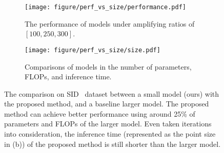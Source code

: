 \documentclass[10pt,twocolumn,letterpaper]{article}
\begin{document}
\begin{figure}[htbp]
    \centering
    \begin{subfigure}{0.48\linewidth}
    \texttt{[image: figure/perf\_vs\_size/performance.pdf]}
    \vspace{-0.35cm}
    \caption{The performance of models under amplifying ratios of $[100, 250, 300]$.}
    \end{subfigure}
    \hspace{0.1cm}
    \begin{subfigure}{0.48\linewidth}
    \texttt{[image: figure/perf\_vs\_size/size.pdf]}
    \vspace{-0.55cm}
    \caption{Comparisons of models in the number of parameters, FLOPs, and inference time.}
    \end{subfigure}
    \vspace{-0.7cm}
    \caption{The comparison on SID~\cite{chen2018learning} dataset between a small model (ours) with the proposed method, and a baseline larger model. The proposed method can achieve better performance using around 25\% of parameters and FLOPs of the larger model. Even taken iterations into consideration, the inference time (represented as the point size in (b)) of the proposed method is still shorter than the larger model.}
    \label{fig:perf_vs_size}
    \vspace{-0.1cm}
\end{figure}

\begin{table}[htbp]
    \centering
    \vspace{-0.3cm}
    \caption{Quantitative results on Sony subset of SID.}
    \label{tab:sid}
    \vspace{-0.1cm}
\end{table}
\end{document}
